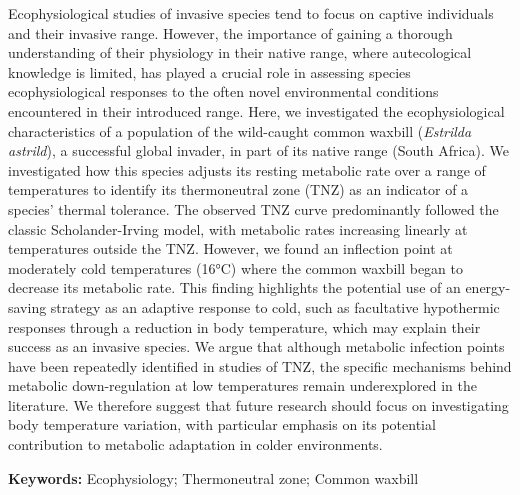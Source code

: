 \documentclass[10pt, twoside]{book} %
\begin{document}
Ecophysiological studies of invasive species tend to focus on captive individuals and their invasive range. However, the importance of gaining a thorough understanding of their physiology in their native range, where autecological knowledge is limited, has played a crucial role in assessing species ecophysiological responses to the often novel environmental conditions encountered in their introduced range. Here, we investigated the ecophysiological characteristics of a population of the wild-caught common waxbill (\textit{Estrilda astrild}), a successful global invader, in part of its native range (South Africa). We investigated how this species adjusts its resting metabolic rate over a range of temperatures to identify its thermoneutral zone (TNZ) as an indicator of a species' thermal tolerance. The observed TNZ curve predominantly followed the classic Scholander-Irving model, with metabolic rates increasing linearly at temperatures outside the TNZ. However, we found an inflection point at moderately cold temperatures (16°C) where the common waxbill began to decrease its metabolic rate. This finding highlights the potential use of an energy-saving strategy as an adaptive response to cold, such as facultative hypothermic responses through a reduction in body temperature, which may explain their success as an invasive species. We argue that although metabolic infection points have been repeatedly identified in studies of TNZ, the specific mechanisms behind metabolic down-regulation at low temperatures remain underexplored in the literature. We therefore suggest that future research should focus on investigating body temperature variation, with particular emphasis on its potential contribution to metabolic adaptation in colder environments.



\vspace*{\fill}
\noindent \textbf{Keywords:} Ecophysiology; Thermoneutral zone; Common waxbill
\clearpage
\end{document}
